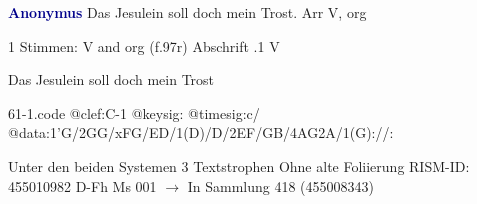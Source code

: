 \documentclass[twocolumn]{book}
\begin{document}
\newline \par \vspace{7pt} \textcolor{darkblue}{\textbf{Anonymus  }}
\newline Das Jesulein soll doch mein Trost. Arr
\newline V, org
\newline \begin{itshape}\end{itshape} 
\newline \textcolor{darkblue}{}  1 Stimmen: V and org  (f.97r)
\newline Abschrift
.1  V
\newline \begin{footnotesize} Das Jesulein soll doch mein Trost \end{footnotesize}  
\begin{filecontents*}{61-1.code}
@clef:C-1
@keysig:
@timesig:c/
@data:1'G/2GG/xFG/ED/1(D)/D/2EF/GB/4AG2A/1(G)://:
\end{filecontents*}
\newline
%
\newline Unter den beiden Systemen 3 Textstrophen
\newline Ohne alte Foliierung
\newline RISM-ID: 455010982
\newline D-Fh  Ms 001
\newline $\rightarrow$ In Sammlung 418 (455008343)
      
\end{document}
